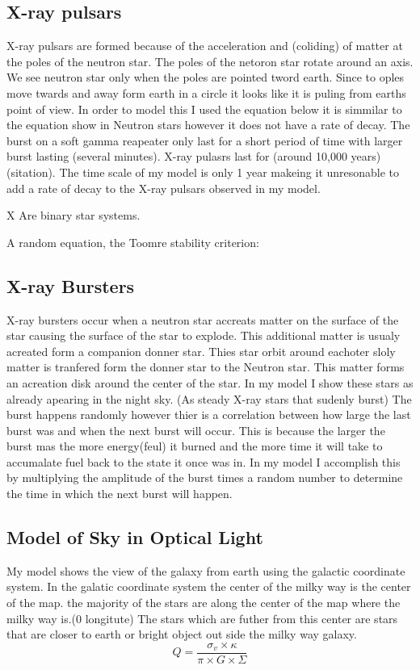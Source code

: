 \documentclass[final,8p,times,twocolumn,authoryear]{elsarticle}
\begin{document}
\subsection{X-ray pulsars}

X-ray pulsars are formed because of the acceleration and (coliding) of matter at the poles of the neutron star. The poles of the netoron star rotate around an axis. We see neutron star only when the poles are pointed tword earth. Since to oples move twards and away form earth in a circle it looks like it is puling from earths point of view. In order to model this I used the equation below it is simmilar to the equation show in Neutron stars however it does not have a rate of decay. The burst on a soft gamma reapeater only last for a short period of time with larger burst lasting (several minutes). X-ray pulasrs last for (around 10,000 years)(sitation). The time scale of my model is only 1 year makeing it unresonable to add a rate of decay to the X-ray pulsars observed in my model. 

X
Are binary star systems.

A random equation, the Toomre stability criterion:

\subsection{X-ray Bursters}

X-ray bursters occur when a neutron star accreats matter on the surface of the star causing the surface of the star to explode. This additional matter is usualy acreated form a companion donner star. Thies star orbit around eachoter sloly matter is tranfered form the donner star to the Neutron star. This matter forms an acreation disk around the center of the star.
In my model I show these stars as already apearing in the night sky. (As steady X-ray stars that sudenly burst) The burst happens randomly however thier is a correlation between how large the last burst was and when the next burst will occur. This is because the larger the burst mas the more energy(feul) it burned and the more time it will take to accumalate fuel back to the state it once was in. In my model I accomplish this by multiplying the amplitude of the burst times a random number to determine the time in which the next burst will happen. 

\subsection{Model of Sky in Optical Light}
My model shows the view of the galaxy from earth using the galactic coordinate system. In the galatic coordinate system the center of the milky way is the center of the map. the majority of the stars are along the center of the map where the milky way is.(0 longitute) The stars which are futher from this center are stars that are closer to earth or bright object out side the milky way galaxy.
\begin{equation}
    Q = \frac{\sigma_v \times \kappa}{\pi \times G \times \Sigma}
\end{equation}
\end{document}
